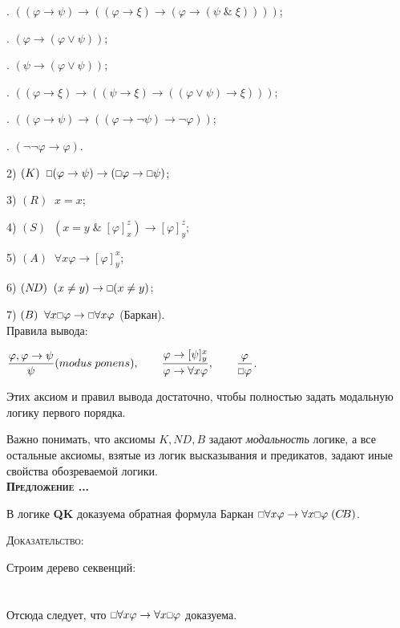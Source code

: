 \documentclass[18pt, a4paper]{extarticle}
\newcounter{par}
\newcounter{spar}
\newcounter{zap}
\newcommand{\predl}{\textbf{\textsc{Предложение \thepar.\if\thespar1\thespar.\fi\thezap.\;}}\stepcounter{zap}}
\newcommand{\centr}[1]{\makebox[\linewidth]{#1}}
\newcommand{\dok}{\textsc{Доказательство:}}
\newcommand{\ampersand}{\;\&\;}
\newcommand{\vp}{\varphi}
\newcommand{\need}{\scalebox{0.75}{$\Box$}}
\begin{document}
. $((\varphi\to\psi)\to((\varphi\to\xi)\to(\varphi\to(\psi\ampersand\xi))))$;

. $(\varphi\to(\varphi\vee\psi))$;

. $(\psi\to(\varphi\vee\psi))$;

. $((\varphi\to\xi)\to((\psi\to\xi)\to((\varphi\vee\psi)\to\xi)))$;

. $((\varphi\to\psi)\to((\varphi\to\lnot\psi)\to\lnot\varphi))$;

. $(\lnot\lnot\varphi\to\varphi)$.

2) $(K)\;\;\need(\vp\to\psi)\to(\need\vp\to\need\psi)$;

3) $(R)\;\;x=x$;

4) $(S)\;\;(x=y\ampersand[\vp]^z_x)\to[\vp]^z_y$;

5) $(A)\;\;\forall x\vp\to[\vp]^x_y$;

6) $(N\!D)\;\;(x\neq y)\to\need(x\neq y)$;

7) $(B)\;\;\forall x\need\vp\to\need\forall x\vp$ (Баркан).\\

Правила вывода:

$\displaystyle\frac{\vp,\vp\to\psi}{\psi}(modus\; ponens),\qquad\displaystyle\frac{\vp\to[\psi]^x_y}{\vp\to\forall x\vp},\qquad\displaystyle\frac{\vp}{\need\vp}$.

Этих аксиом и правил вывода достаточно, чтобы полностью задать модальную логику первого порядка.

Важно понимать, что аксиомы $K,N\!D,B$ задают \textit{модальность} логике, а все остальные аксиомы, взятые из логик высказывания и предикатов, задают иные свойства обозреваемой логики.\\

\predl

В логике \textbf{QK} доказуема обратная формула Баркан $\need\forall x\vp\to\forall x\need\vp\;(C\!B)$. 

\dok

Строим дерево секвенций:\\
\\\centr{$\displaystyle\frac{\overset{\displaystyle\forall x\vp\to\vp}{\overline{\need(\forall x\vp\to\vp)}},\qquad\need(\forall x\vp\to\vp)\to(\need\forall x\vp\to\need\vp)}{\displaystyle\frac{\need\forall x\vp\to\need\vp}{\need\forall x\vp\to\forall x\need\vp}}$}\\

Отсюда следует, что $\need\forall x\vp\to\forall x\need\vp$ доказуема.
\end{document}
